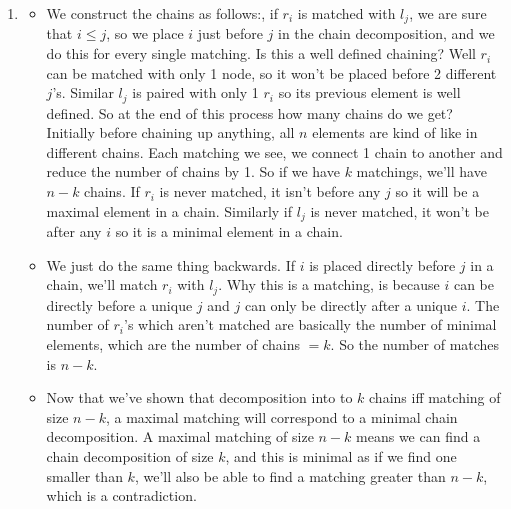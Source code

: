 \documentclass[12pt]{report}
\begin{document}
\begin{enumerate}[label=\textbf{\arabic*.}]
  \item 
  \begin{itemize}
    \item We construct the chains as follows:, if $r_i$ is matched with $l_j$, we are sure that $i \leq j$, so we place $i$ just before $j$ in the chain
    decomposition, and we do this for every single matching. Is this a well defined chaining? Well $r_i$ can be matched with only 1 node, so it won't 
    be placed before 2 different $j$'s. Similar $l_j$ is paired with only 1 $r_i$ so its previous element is well defined. So at the end of this process
    how many chains do we get? Initially before chaining up anything, all $n$ elements are kind of like in different chains. Each matching we see, we 
    connect 1 chain to another and reduce the number of chains by 1. So if we have $k$ matchings, we'll have $n-k$ chains.
    If $r_i$ is never matched, it isn't before any $j$ so it will be a maximal element in a chain. Similarly if $l_j$ is never matched, it won't be after
    any $i$ so it is a minimal element in a chain.
    \item We just do the same thing backwards. If $i$ is placed directly before $j$ in a chain, we'll match $r_i$ with $l_j$. Why this is a matching,
    is because $i$ can be directly before a unique $j$ and $j$ can only be directly after a unique $i$. The number of $r_i$'s which aren't matched are
    basically the number of minimal elements, which are the number of chains $= k$. So the number of matches is $n-k$.
    \item Now that we've shown that decomposition into to $k$ chains iff matching of size $n-k$, a maximal matching will correspond to a minimal chain 
    decomposition. A maximal matching of size $n-k$ means we can find a chain decomposition of size $k$, and this is minimal as if we find one smaller than 
    $k$, we'll also be able to find a matching greater than $n-k$, which is a contradiction. 
  \end{itemize}


\end{enumerate}
\end{document}
